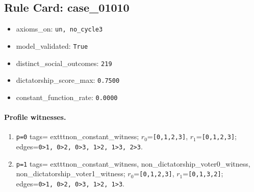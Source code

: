 \subsection*{Rule Card: case\_01010}
\begin{itemize}
\item axioms\_on: \texttt{un, no\_cycle3}
\item model\_validated: \texttt{True}
\item distinct\_social\_outcomes: \texttt{219}
\item dictatorship\_score\_max: \texttt{0.7500}
\item constant\_function\_rate: \texttt{0.0000}
\end{itemize}
\paragraph{Profile witnesses.}
\begin{enumerate}
\item \texttt{p=0} tags=	exttt{non\_constant\_witness}; $r_0$=\texttt{[0,1,2,3]}, $r_1$=\texttt{[0,1,2,3]}; edges=\texttt{0>1, 0>2, 0>3, 1>2, 1>3, 2>3}.
\item \texttt{p=1} tags=	exttt{non\_constant\_witness, non\_dictatorship\_voter0\_witness, non\_dictatorship\_voter1\_witness}; $r_0$=\texttt{[0,1,2,3]}, $r_1$=\texttt{[0,1,3,2]}; edges=\texttt{0>1, 0>2, 0>3, 1>2, 1>3}.
\end{enumerate}
